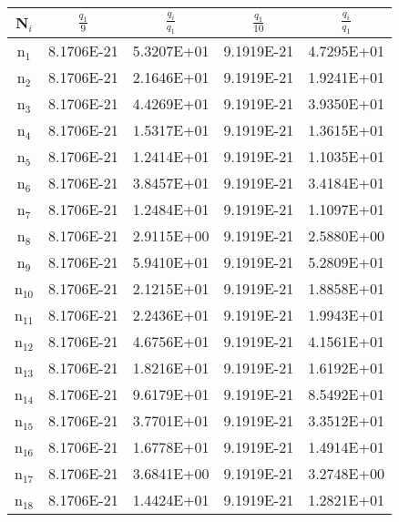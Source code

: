 \documentclass{article}
\begin{document}
\begin{enumerate}
\begin{table}[h!]
    \centering
    \begin{tabular}{|c|c|c|c|c|}
    \hline
       N$_{i}$  & $\frac{q_{1}}{9}$ & $\frac{q_{i}}{q_{1}}$ & $\frac{q_{1}}{10}$ & $\frac{q_{i}}{q_{1}}$\\
       \hline
       n$_{1}$  & 8.1706E-21 & 5.3207E+01 & 9.1919E-21 & 4.7295E+01\\
       \hline
       n$_{2}$  & 8.1706E-21 & 2.1646E+01 & 9.1919E-21 & 1.9241E+01\\
       \hline       
       n$_{3}$  & 8.1706E-21 & 4.4269E+01 & 9.1919E-21 & 3.9350E+01\\
       \hline       
       n$_{4}$  & 8.1706E-21 & 1.5317E+01 & 9.1919E-21 & 1.3615E+01\\
       \hline       
       n$_{5}$  & 8.1706E-21 & 1.2414E+01 & 9.1919E-21 & 1.1035E+01\\
       \hline       
       n$_{6}$  & 8.1706E-21 & 3.8457E+01 & 9.1919E-21 & 3.4184E+01\\
       \hline       
       n$_{7}$  & 8.1706E-21 & 1.2484E+01 & 9.1919E-21 & 1.1097E+01\\
       \hline       
       n$_{8}$  & 8.1706E-21 & 2.9115E+00 & 9.1919E-21 & 2.5880E+00\\
       \hline       
       n$_{9}$  & 8.1706E-21 & 5.9410E+01 & 9.1919E-21 & 5.2809E+01\\
       \hline       
       n$_{10}$  & 8.1706E-21 & 2.1215E+01 & 9.1919E-21 & 1.8858E+01\\
       \hline       
       n$_{11}$  & 8.1706E-21 & 2.2436E+01 & 9.1919E-21 & 1.9943E+01\\
       \hline       
       n$_{12}$  & 8.1706E-21 & 4.6756E+01 & 9.1919E-21 & 4.1561E+01\\
       \hline       
       n$_{13}$  & 8.1706E-21 & 1.8216E+01 & 9.1919E-21 & 1.6192E+01\\
       \hline       
       n$_{14}$  & 8.1706E-21 & 9.6179E+01 & 9.1919E-21 & 8.5492E+01\\
       \hline
       n$_{15}$  & 8.1706E-21 & 3.7701E+01 & 9.1919E-21 & 3.3512E+01\\
       \hline       
       n$_{16}$  & 8.1706E-21 & 1.6778E+01 & 9.1919E-21 & 1.4914E+01\\
       \hline       
       n$_{17}$  & 8.1706E-21 & 3.6841E+00 & 9.1919E-21 & 3.2748E+00\\
       \hline       
       n$_{18}$  & 8.1706E-21 & 1.4424E+01 & 9.1919E-21 & 1.2821E+01\\

\end{tabular}
\end{table}
\end{enumerate}
\end{document}
